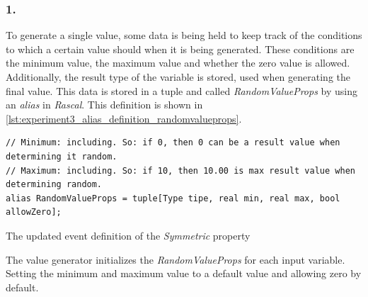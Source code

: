 \subsubsection{1. }
To generate a single value, some data is being held to keep track of the
conditions to which a certain value should when it is being generated. These
conditions are the minimum value, the maximum value and whether the zero value
is allowed. Additionally, the result type of the variable is stored, used when
generating the final value. This data is stored in a tuple and called
\textit{RandomValueProps} by using an \textit{alias} in \textit{Rascal}. This
definition is shown in
\autoref{lst:experiment3_alias_definition_randomvalueprops}.
\begin{sourcecode}[!ht]
\begin{lstlisting}[language=Rascal]
// Minimum: including. So: if 0, then 0 can be a result value when determining it random.
// Maximum: including. So: if 10, then 10.00 is max result value when determining random.
alias RandomValueProps = tuple[Type tipe, real min, real max, bool allowZero];
\end{lstlisting}
\caption{The updated event definition of the \textit{Symmetric} property}
\label{lst:experiment3_alias_definition_randomvalueprops}
\end{sourcecode}
\FloatBarrier\noindent
The value generator initializes the \textit{RandomValueProps} for each input
variable. Setting the minimum and maximum value to a default value and allowing
zero by default.

